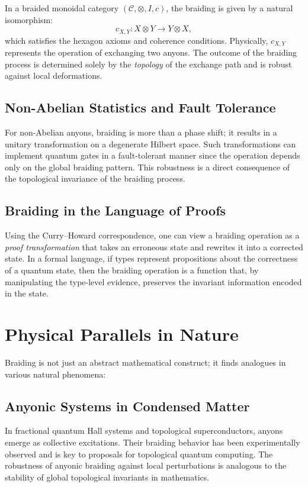 \documentclass[12pt]{article}
\begin{document}
In a braided monoidal category $(\mathcal{C}, \otimes, I, c)$, the braiding is given by a natural isomorphism:
\[
c_{X,Y}: X \otimes Y \rightarrow Y \otimes X,
\]
which satisfies the hexagon axioms and coherence conditions. Physically, $c_{X,Y}$ represents the operation of exchanging two anyons. The outcome of the braiding process is determined solely by the \emph{topology} of the exchange path and is robust against local deformations.

\subsection{Non-Abelian Statistics and Fault Tolerance}

For non-Abelian anyons, braiding is more than a phase shift; it results in a unitary transformation on a degenerate Hilbert space. Such transformations can implement quantum gates in a fault-tolerant manner since the operation depends only on the global braiding pattern. This robustness is a direct consequence of the topological invariance of the braiding process.

\subsection{Braiding in the Language of Proofs}

Using the Curry–Howard correspondence, one can view a braiding operation as a \emph{proof transformation} that takes an erroneous state and rewrites it into a corrected state. In a formal language, if types represent propositions about the correctness of a quantum state, then the braiding operation is a function that, by manipulating the type-level evidence, preserves the invariant information encoded in the state.

\section{Physical Parallels in Nature}

Braiding is not just an abstract mathematical construct; it finds analogues in various natural phenomena:

\subsection{Anyonic Systems in Condensed Matter}

In fractional quantum Hall systems and topological superconductors, anyons emerge as collective excitations. Their braiding behavior has been experimentally observed and is key to proposals for topological quantum computing. The robustness of anyonic braiding against local perturbations is analogous to the stability of global topological invariants in mathematics.
\end{document}
